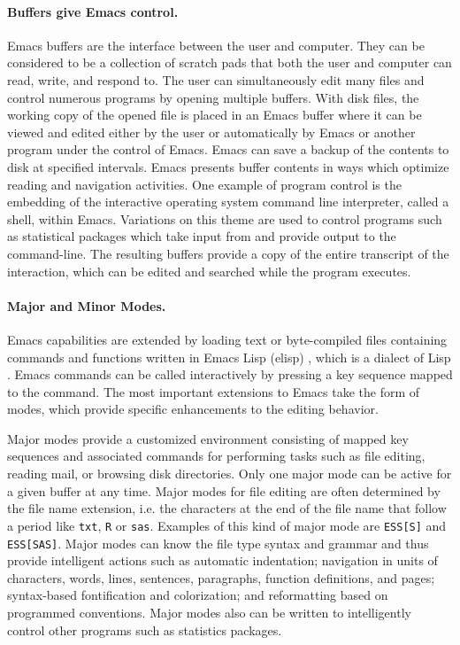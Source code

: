 \documentclass{article}
\newcommand{\stexttt}[1]{{\small\texttt{#1}}}
\begin{document}
\paragraph{Buffers give Emacs control.}
Emacs buffers are the interface between the user and computer.  They
can be considered to be a collection of scratch pads that both the
user and computer can read, write, and respond to.  The user can
simultaneously edit many files and control numerous programs by
opening multiple buffers.  With disk files, the working copy of the
opened file is placed in an Emacs buffer where it can be viewed and
edited either by the user or automatically by Emacs or another program
under the control of Emacs.  Emacs can save a backup of the contents
to disk at specified intervals.  Emacs presents buffer contents in
ways which optimize reading and navigation activities.  One example of
program control is the embedding of the interactive operating system
command line interpreter, called a shell, within Emacs.  Variations on
this theme are used to control programs such as statistical packages
which take input from and provide output to the command-line.  The
resulting buffers provide a copy of the entire transcript of the
interaction, which can be edited and searched while the program
executes.

\paragraph{Major and Minor Modes.}
Emacs capabilities are extended by loading text or byte-compiled files
containing commands and functions written in Emacs Lisp (elisp)
\citep{RChassell1999}, which is a dialect of Lisp
\citep{PGraham:1996}.  Emacs commands can be called interactively by
pressing a key sequence mapped to the command.
The most important extensions to Emacs take the form of modes, which
provide specific enhancements to the editing behavior.

Major modes provide a customized environment consisting of mapped key
sequences and associated commands for performing tasks such as file
editing, reading mail, or browsing disk directories.  Only one major
mode can be active for a given buffer at any time.  Major modes for
file editing are often determined by the file name extension, i.e.
the characters at the end of the file name that follow a period like
\stexttt{txt}, \stexttt{R} or \stexttt{sas}.  Examples of this kind of
major mode are \stexttt{ESS[S]} and \stexttt{ESS[SAS]}.  Major modes
can know the file type syntax and grammar and thus provide intelligent
actions such as automatic indentation; navigation in units of
characters, words, lines, sentences, paragraphs, function definitions,
and pages; syntax-based fontification and colorization; and
reformatting based on programmed conventions.  Major modes also can be
written to intelligently control other programs such as statistics
packages.
\end{document}
